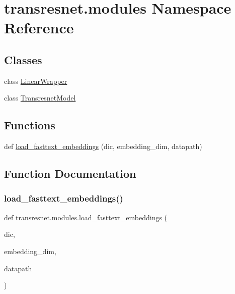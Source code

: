 \hypertarget{namespacetransresnet_1_1modules}{}\section{transresnet.\+modules Namespace Reference}
\label{namespacetransresnet_1_1modules}
\subsection*{Classes}
\begin{DoxyCompactItemize}
\item 
class \hyperlink{classtransresnet_1_1modules_1_1LinearWrapper}{Linear\+Wrapper}
\item 
class \hyperlink{classtransresnet_1_1modules_1_1TransresnetModel}{Transresnet\+Model}
\end{DoxyCompactItemize}
\subsection*{Functions}
\begin{DoxyCompactItemize}
\item 
def \hyperlink{namespacetransresnet_1_1modules_a5caddff64a700c7def7e2479168afdfe}{load\+\_\+fasttext\+\_\+embeddings} (dic, embedding\+\_\+dim, datapath)
\end{DoxyCompactItemize}


\subsection{Function Documentation}
\mbox{\label{namespacetransresnet_1_1modules_a5caddff64a700c7def7e2479168afdfe}} 
\subsubsection{\texorpdfstring{load\+\_\+fasttext\+\_\+embeddings()}{load\_fasttext\_embeddings()}}
{\footnotesize\ttfamily def transresnet.\+modules.\+load\+\_\+fasttext\+\_\+embeddings (\begin{DoxyParamCaption}\item[{}]{dic,  }\item[{}]{embedding\+\_\+dim,  }\item[{}]{datapath }\end{DoxyParamCaption})}

